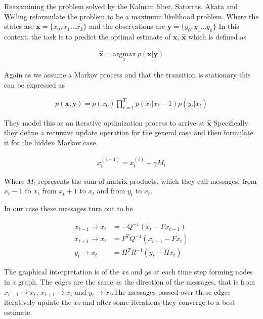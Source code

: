\documentclass[]{../resources/final_report}
\begin{document}
Reexamining the problem solved by the Kalman filter, Satorras, Akata and Welling reformulate the problem to be a maximum likelihood problem\cite{Satorras2019CombiningGA}.
Where the states are $\mathbf{x} = \{x_0, x_1 ... x_k\}$ and the observations are $\mathbf{y} = \{y_0, y_1 ... y_k\}$
In this context, the task is to predict the optimal estimate of $\mathbf{x}$, $\mathbf{\hat{x}}$ which is defined as

\begin{align}
  \mathbf{\hat{x}} = \underset{x}{\text{argmax}}\ p(\mathbf{x}|\mathbf{y})
\end{align}

Again as we assume a Markov process and that the transition is stationary this can be expressed as 

\begin{align}
  p(\mathbf{x},\mathbf{y}) = p(x_0)\prod_{t=1}^T p(x_t|x_t-1) p(y_t|x_t)
\end{align}

They model this as an iterative optimization process to arrive at $\mathbf{\hat{x}}$
Specifically they define a recursive update operation for the general case and then formulate it for the hidden Markov case

\begin{align}
  x_t^{(i+1)} = x_t^{(i)} + \gamma M_t
\end{align}

Where $M_t$ represents the sum of matrix products, which they call messages, from $x_t-1$ to $x_t$ from $x_t+1$ to $x_t$ and from $y_t$ to $x_t$.

In our case these messages turn out to be

\begin{align}
  x_{t-1} \rightarrow x_{t} &= -Q^{-1}(x_t - Fx_{t-1}) \\
  x_{t+1} \rightarrow x_{t} &= F^TQ^{-1}(x_{t+1} - Fx_t) \\
  y_t \rightarrow x_t &= H^TR^{-1}(y_t - Hx_t) 
\end{align}

The graphical interpretation is of the $x$s and $y$s at each time step forming nodes in a graph. The edges are the same as the direction of the messages, that is from $x_{t-1} \rightarrow x_t$, $x_{t+1} \rightarrow x_t$ and $y_t \rightarrow x_t$.The messages passed over these edges iteratively update the $x$s and after some iterations they converge to a best estimate.

\end{document}
